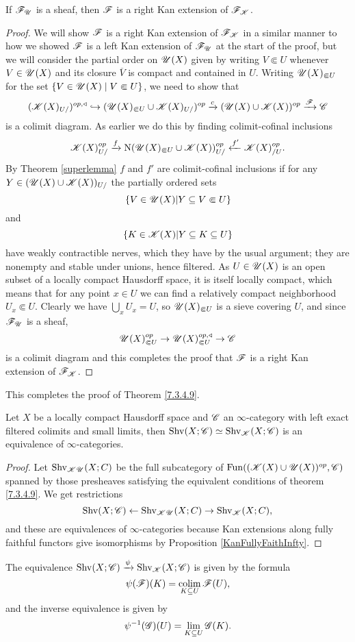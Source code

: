 \documentclass[../../thesis.tex]{subfiles}
\begin{document}
\begin{lemma}
    If $\mathscr{F}_{\mathscr{U}}$ is a sheaf, then $\mathscr{F}$ is a right Kan extension of $\mathscr{F}_{\mathscr{K}}$.
\end{lemma}
\begin{proof}
    We will show $\mathscr{F}$ is a right Kan extension of $\mathscr{F}_{\mathscr{K}}$ in a similar manner to how we showed $\mathscr{F}$ is a left Kan extension of $\mathscr{F}_{\mathscr{U}}$ at the start of the proof, but we will consider the partial order on $\mathscr{U}(X)$ given by writing $V\Subset U$ whenever $V\in \mathscr{U}(X)$ and its closure $\overline{V}$ is compact and contained in $U$.
    Writing $\mathscr{U}(X)_{\Subset U}$ for the set $\{V\in \mathscr{U}(X) \mid V\Subset U\}$, we need to show that
    \[
        (\mathscr{K}(X)_{U/})^{op,\triangleleft} \hookrightarrow (\mathscr{U}(X)_{\Subset U} \cup \mathscr{K}(X)_{U/})^{op} \xrightarrow{c}(\mathscr{U}(X) \cup \mathscr{K}(X))^{op} \xrightarrow{\mathscr{F}} \mathscr{C}
    \]
    is a colimit diagram.
    As earlier we do this by finding colimit-cofinal inclusions
    \[
        \mathscr{K}(X)_{U/}^{op} \xrightarrow{f}\mathrm{N}(\mathscr{U}(X)_{\Subset U} \cup \mathscr{K}(X))_{U/}^{op} \xleftarrow{f'} \mathscr{K}(X)_{/U}^{op}.
    \]
    By Theorem \ref{superlemma} $f$ and $f'$ are colimit-cofinal inclusions if for any $Y\in (\mathscr{U}(X) \cup \mathscr{K}(X))_{U/}$ the partially ordered sets
    \[
        \{ V \in \mathscr{U}(X) |Y \subseteq V \Subset U \}
    \]
    and
    \[
        \{ K \in \mathscr{K}(X) |Y \subseteq K \subseteq U \}
    \]
    have weakly contractible nerves, which they have by the usual argument; they are nonempty and stable under unions, hence filtered.
    As $U\in \mathscr{U}(X)$ is an open subset of a locally compact Hausdorff space, it is itself locally compact, which means that for any point $x \in U$ we can find a relatively compact neighborhood $U_x \Subset U$.
    Clearly we have $\bigcup_x U_x = U$, so $\mathscr{U}(X)_{\Subset U}$ is a sieve covering $U$, and since $\mathscr{F}_{\mathscr{U}}$ is a sheaf,
    \[
        \mathscr{U}(X)_{\Subset U}^{op} \to \mathscr{U}(X)_{\Subset U}^{op, \triangleleft} \to \mathscr{C}
    \]
    is a colimit diagram and this completes the proof that $\mathscr{F}$ is a right Kan extension of $\mathscr{F}_{\mathscr{K}}$.
\end{proof}
This completes the proof of Theorem \ref{7.3.4.9}.
\begin{corollary}\label{7.3.4.10}
    Let $X$ be a locally compact Hausdorff space and $\mathscr{C}$ an $\infty$-category with left exact filtered colimits and small limits, then $\mathrm{Shv}(X;\mathscr{C}) \simeq \mathrm{Shv}_{\mathscr{K}}(X;\mathscr{C})$ is an equivalence of $\infty$-categories.
\end{corollary}
\begin{proof}
    Let $\mathrm{Shv}_{\mathscr{K}\mathscr{U}}(X;C)$ be the full subcategory of $\mathrm{Fun}((\mathscr{K}(X)\cup \mathscr{U}(X))^{op},\mathscr{C})$ spanned by those presheaves satisfying the equivalent conditions of theorem \ref{7.3.4.9}. We get restrictions
    \[
        \mathrm{Shv}(X;\mathscr{C}) \leftarrow \mathrm{Shv}_{\mathscr{K}\mathscr{U}}(X;C) \rightarrow \mathrm{Shv}_{\mathscr{K}}(X;C),
    \]
    and these are equivalences of $\infty$-categories because Kan extensions along fully faithful functors give isomorphisms by Proposition \ref{KanFullyFaithInfty}.
\end{proof}
\begin{remark}
    The equivalence $\mathrm{Shv}(X;\mathscr{C})\xrightarrow{\psi}\mathrm{Shv}_{\mathscr{K}}(X;\mathscr{C})$ is given by the formula
    \[
        \psi(\mathscr{F})(K) = \operatorname*{colim}_{K\subseteq U}\mathscr{F}(U),
    \]
    and the inverse equivalence is given by
    \[
        \psi^{-1}(\mathscr{G})(U) = \lim_{K\subseteq U}\mathscr{G}(K).
    \]
\end{remark}
\end{document}
